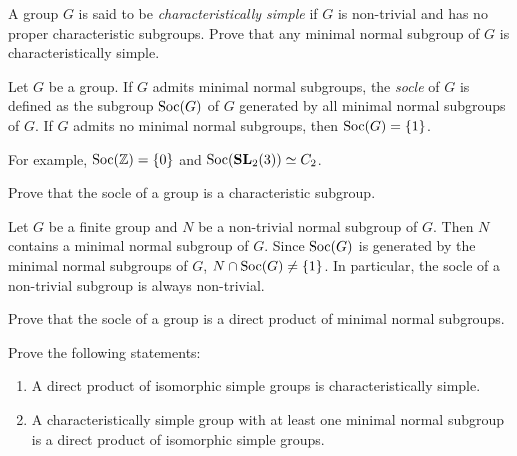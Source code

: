 \begin{exercise}
\label{xca:characteristically_simple}
    A group $G$ is said to be \emph{characteristically simple} if $G$ is non-trivial 
    and has no proper characteristic subgroups. 
    Prove that any minimal normal subgroup of $G$ is characteristically simple. 
\end{exercise}

\begin{definition}
    Let $G$ be a group. If $G$ admits minimal normal subgroups, the \emph{socle} of $G$ 
    is defined as the subgroup $\operatorname{Soc}(G)$ of $G$ generated by all minimal normal subgroups of $G$. If $G$ admits no minimal normal subgroups, 
    then $\operatorname{Soc}(G)=\{1\}$. 
\end{definition}

For example, $\operatorname{Soc}(\mathbb{Z})=\{0\}$ and $\operatorname{Soc}(\mathbf{SL}_2(3))\simeq C_2$. 

\begin{exercise}
    \label{xca:socle_characteristic}
    Prove that the socle of a group is a characteristic subgroup. 
\end{exercise}

Let $G$ be a finite group and $N$ be a non-trivial normal subgroup of $G$. Then 
$N$ contains a minimal normal subgroup of $G$. Since 
$\operatorname{Soc}(G)$ is generated by the minimal normal subgroups of $G$, 
$N\cap\operatorname{Soc}(G)\ne\{1\}$. In particular, the socle of a non-trivial subgroup is always non-trivial. 



\begin{exercise}
\label{xca:Soc_direct_product}
    Prove that the socle of a group is a direct product of minimal normal subgroups. 
\end{exercise}

\begin{exercise}
\label{xca:caracteristically_simple}
Prove the following statements:
    \begin{enumerate}
        \item A direct product of isomorphic simple groups is characteristically simple.
        \item A characteristically simple group with at least one minimal normal subgroup is a direct product of isomorphic simple groups. 
    \end{enumerate}
\end{exercise}

